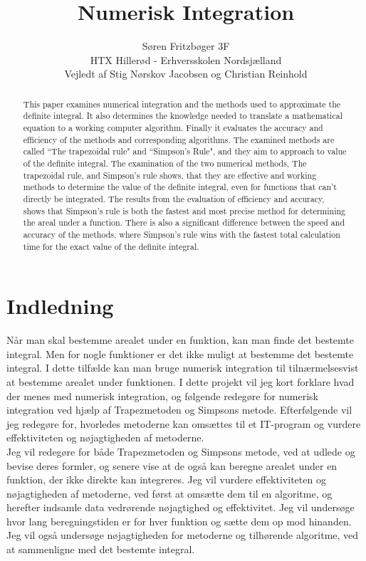 \documentclass[12pt]{article}
\numberwithin{equation}{section}
\begin{document}
	
	\setcounter{page}{1}
\title{Numerisk Integration}
\author{Søren Fritzbøger 3F\\
HTX Hillerød - Erhversskolen Nordsjælland\\
Vejledt af Stig Nørskov Jacobsen og Christian Reinhold}
\renewcommand{\today}{2. Februar 2015}
\maketitle

\begin{abstract}
This paper examines numerical integration and the methods used to approximate the definite integral. It also determines the knowledge needed to translate a mathematical equation to a working computer algorithm. Finally it evaluates the accuracy and efficiency of the methods and corresponding algorithms. The examined methods are called ``The trapezoidal rule" and ``Simpson's Rule", and they aim to approach to value of the definite integral. The examination of the two numerical methods, The trapezoidal rule, and Simpson's rule shows, that they are effective and working methods to determine the value of the definite integral, even for functions that can't directly be integrated. The results from the evaluation of efficiency and accuracy, shows that Simpson's rule is both the fastest and most precise method for determining the areal under a function. There is also a significant difference between the speed and accuracy of the methods, where Simpson's rule wins with the fastest total calculation time for the exact value of the definite integral.
\end{abstract}

\newpage
\tableofcontents
\newpage
\section{Indledning}
Når man skal bestemme arealet under en funktion, kan man finde det bestemte integral. Men for nogle funktioner er det ikke muligt at bestemme det bestemte integral. I dette tilfælde kan man bruge numerisk integration til tilnærmelsesvist at bestemme arealet under funktionen. I dette projekt vil jeg kort forklare hvad der menes med numerisk integration, og følgende redegøre for numerisk integration ved hjælp af Trapezmetoden og Simpsons metode. Efterfølgende vil jeg redegøre for, hvorledes metoderne kan omsættes til et IT-program og vurdere effektiviteten og nøjagtigheden af metoderne.
\\
Jeg vil redegøre for både Trapezmetoden og Simpsons metode, ved at udlede og bevise deres formler, og senere vise at de også kan beregne arealet under en funktion, der ikke direkte kan integreres. Jeg vil vurdere effektiviteten og nøjagtigheden af metoderne, ved først at omsætte dem til en algoritme, og herefter indsamle data vedrørende nøjagtighed og effektivitet. Jeg vil undersøge hvor lang beregningstiden er for hver funktion og sætte dem op mod hinanden. Jeg vil også undersøge nøjagtigheden for metoderne og tilhørende algoritme, ved at sammenligne med det bestemte integral.
\end{document}
